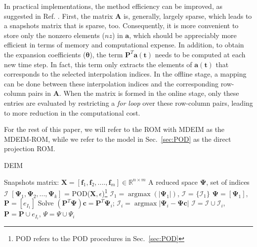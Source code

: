 \documentclass[]{interact}
\DeclareMathOperator{\argmaxH}{argmax}
\newcommand\abs[1]{\left|#1\right|}
\theoremstyle{plain}%
\theoremstyle{definition}
\theoremstyle{remark}
\begin{document}
In practical implementations, the method efficiency can be improved, as suggested in Ref. \cite{negri2015efficient}.
First, the matrix $\mathbf{A}$ is, generally, largely sparse, which leads to a snapshots matrix that is sparse, too.
Consequently, it is more convenient to store only the nonzero elements ($nz$) in $\mathbf{a}$, 
which should be appreciably more efficient in terms of memory and computational expense.
In addition, to obtain the expansion coefficients ($\boldsymbol{\theta}$), the term $\mathbf{P}^T\mathbf{a(t)}$ needs to be computed at each new time step.
In fact, this term only extracts the elements of $\mathbf{a(t)}$ that corresponds to the selected  interpolation indices.
In the offline stage, a mapping can be done between these interpolation indices and the corresponding row-column pairs in $\mathbf{A}$.
When the matrix is formed in the online stage, only these entries are evaluated by restricting a \textit{for loop} over these row-column pairs, leading to more reduction in the computational cost.

For the rest of this paper, we will refer to the ROM with MDEIM as the MDEIM-ROM, while we refer to the model in Sec.~\ref{sec:POD} as the direct projection ROM.


\noindent\begin{minipage}{\textwidth}
	\renewcommand\footnoterule{}
	\begin{algorithm}[H]
		\caption{DEIM}
		\label{alg:DEIM}
		\begin{algorithmic}[1]
			\REQUIRE Snapshots matrix: $\mathbf{X} = [\mathbf{f}_1, \mathbf{f}_2,  ...., \mathbf{f}_m] \in \mathbb{R}^{n\times m}$
			\ENSURE A reduced space $\mathbf{\Psi}$, set of indices $\mathcal{I}$
			\STATE $[\mathbf{\Psi}_1, \mathbf{\Psi}_2, ..., \mathbf{\Psi}_k ]$ = POD(${\mathbf{X}}, \epsilon$)\footnote{POD refers to the POD procedures in Sec.~\ref{sec:POD}}
			\STATE $\mathcal{I}_1 = \argmaxH(\abs{\mathbf{\Psi}_1})$, $\mathcal{I}$ = $\{\mathcal{I}_1\}$
			\STATE $\mathbf{\Psi} = [\mathbf{\Psi}_1]$, $\mathbf{P} =[e_{I_1}]$
			\STATE Solve $(\mathbf{P}^T\mathbf{\Psi})\mathbf{c} = \mathbf{P}^T\mathbf{\Psi}_i$;
			\STATE $\mathcal{I}_i = \argmaxH{\abs{\mathbf{\Psi}_i - \mathbf{\Psi}\mathbf{c}}}$
			\STATE $\mathcal{I} = \mathcal{I} \cup \mathcal{I}_i$, $\mathbf{P} = \mathbf{P} \cup e_{I_i}$, ${\Psi = \Psi \cup \Psi_i}$
			\ENDFOR
		\end{algorithmic}
	\end{algorithm}
\end{minipage}
\end{document}
